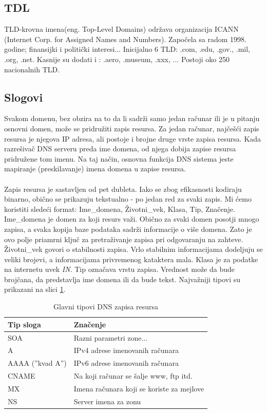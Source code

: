 \documentclass{article} %
\begin{document}
\subsection{TDL}
\noindent TLD-krovna imena(eng. Top-Level Domains) odr\v zava organizacija ICANN (Internet Corp. for Assigned Names and Numbers). Zapo\v cela sa radom 1998. godine; finansijki i politi\v cki interesi... Inicijalno 6 TLD: .com, .edu, .gov., .mil, .org, .net. Kasnije su dodati i : .aero, .museum, .xxx, ... Postoji oko 250 nacionalnih TLD. 


\subsection{Slogovi}
\noindent Svakom domenu, bez obzira na to da li sadr\v zi samo jedan ra\v cunar ili je u pitanju osnovni domen, mo\v ze se pridru\v ziti zapis resursa. Za jedan ra\v cunar, naj\v ce\v s\' ci zapis resursa je njegova IP adresa, ali postoje i brojne druge vrste zapisa resursa. Kada razre\v siva\v c DNS serveru preda ime domena, od njega dobija zapise resursa pridru\v zene tom imenu. Na taj na\v cin, osnovna funkcija DNS sistema jeste mapiranje (preskilavanje) imena domena u zapise resursa.
\\
\\ Zapis resursa je sastavljen od pet dubleta. Iako se zbog efikasnosti kodiraju binarno, obi\v cno se prikazuju tekstualno - po jedan red za svaki zapis. Mi \' cemo koristiti slede\' ci format: Ime\_domena, \v Zivotni\_vek, Klasa, Tip, Zna\v cenje. Ime\_domena je domen za koji resurs va\v zi. Obi\v cno za svaki domen posotji mnogo zapisa, a svaka kopija baze podataka sadr\v zi informacije o vi\v se domena. Zato je ovo polje priamrni klju\v c za pretra\v zivanje zapisa pri odgovaranju na zahteve.  \v Zivotni\_vek govori o stabilnosti zapisa. Vrlo stabilnim informacijama dodeljuju se veliki brojevi, a informacijama privremenog kataktera mala. Klasa je za podatke na internetu uvek \textit{IN}. Tip ozna\v cava vrstu zapisa. Vrednost mo\v ze da bude broj\v cana, da predstavlja ime domena ili da bude tekst. Najva\v zniji tipovi su prikazani na slici \ref{tab: dns zapis resursa}.

\begin{table}[h]
	\centering
	\renewcommand{\arraystretch}{1.2}
	\begin{tabular}{|l|l|}
		\hline
		Tip sloga & Zna\v cenje \\
		\hline
		SOA & Razni parametri zone... \\
		\hline
		A & IPv4 adrese imenovanih ra\v cunara \\
		\hline
		AAAA (''kvad A'') & IPv6 adrese imenovanih ra\v cunara \\
		\hline
		CNAME & Na koji ra\v cunar se \v salje www, ftp itd. \\
		\hline
		MX & Imena ra\v cunara koji se koriste za mejlove \\
		\hline
		NS & Server imena za zonu \\
		\hline
	\end{tabular}
	\caption{Glavni tipovi DNS zapisa resursa}
	\label{tab: dns zapis resursa}
\end{table}
\end{document}
